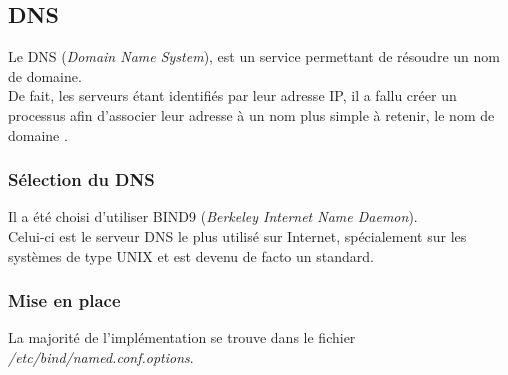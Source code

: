 \subsection{DNS}
\label{subsec:dns}

Le DNS (\emph{Domain Name System}), est un service permettant de  résoudre un nom
de domaine. \\
De fait, les serveurs étant identifiés par leur adresse IP, il a fallu créer un
processus afin d'associer leur adresse à un nom plus simple à retenir, le \og
nom de domaine \fg.

\subsubsection{Sélection du DNS}
\label{subsubsec:selection-dns}

Il a été choisi d'utiliser BIND9 (\emph{Berkeley Internet Name Daemon}). \\
Celui-ci est le serveur DNS le plus utilisé sur Internet, spécialement sur les
systèmes de type UNIX et est devenu de facto un standard.

\subsubsection{Mise en place}
\label{subsubsec:miseen-place}

La majorité de l'implémentation se trouve dans le fichier
\textit{/etc/bind/named.conf.options}.

